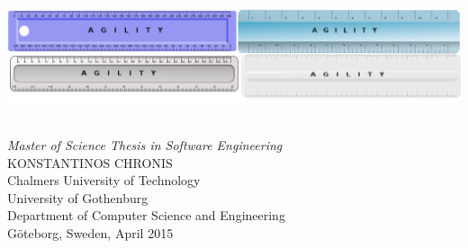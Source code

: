 \begin{titlepage}

\mbox{}
\vfill
\addtolength{\voffset}{2cm}

\includegraphics[scale=0.3]{fig/auxiliary/cover.png}
	
\begin{flushleft}
	{ \\[0.5cm]
\emph{\Large Master of Science Thesis in Software Engineering} \\[.8cm]
	
	{\huge KONSTANTINOS CHRONIS}\\[.8cm]
	
	{\Large Chalmers University of Technology \\
    University of Gothenburg} \\
     Department of Computer Science and Engineering \\
     Göteborg, Sweden,  April 2015
  } 
	
\end{flushleft}

\end{titlepage}
\ClearShipoutPicture

\pagestyle{empty}
\newpage
\clearpage
\mbox{}
\newpage
\clearpage
\thispagestyle{empty}

